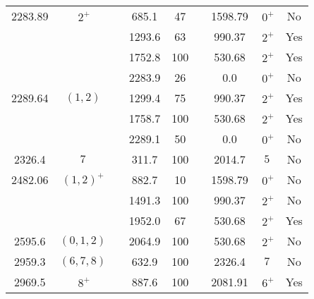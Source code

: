 \begin{tabular}{ccccccccc}
2283.89   & $~2^+$    &            &  685.1     &  47        &                  & 1598.79         & $~0^+$         & No                \\
          &           &            & 1293.6     &  63        &                  &  990.37         & $~2^+$         & Yes               \\
          &           &            & 1752.8     & 100        &                  &  530.68         & $~2^+$         & Yes               \\
          &           &            & 2283.9     &  26        &                  &    0.0          & $~0^+$         & No                \\
2289.64   & $(1,2)$   &            & 1299.4     &  75        &                  &  990.37         & $~2^+$         & Yes               \\
          &           &            & 1758.7     & 100        &                  &  530.68         & $~2^+$         & Yes               \\
          &           &            & 2289.1     &  50        &                  &    0.0          & $~0^+$         & No                \\
2326.4    & $7$       &            &  311.7     & 100        &                  & 2014.7          & $5$            & No                \\
2482.06   & $(1,2)^+$ &            &  882.7     &  10        &                  & 1598.79         & $~0^+$         & No                \\
          &           &            & 1491.3     & 100        &                  &  990.37         & $~2^+$         & No                \\
          &           &            & 1952.0     &  67        &                  &  530.68         & $~2^+$         & Yes               \\
2595.6    & $(0,1,2)$ &            & 2064.9     & 100        &                  &  530.68         & $~2^+$         & No                \\
2959.3    & $(6,7,8)$ &            &  632.9     & 100        &                  &  2326.4         & $7$            & No                \\
2969.5    & $~8^+$    &            &  887.6     & 100        &                  &  2081.91        & $~6^+$         & Yes               \\
\hline
\end{tabular}